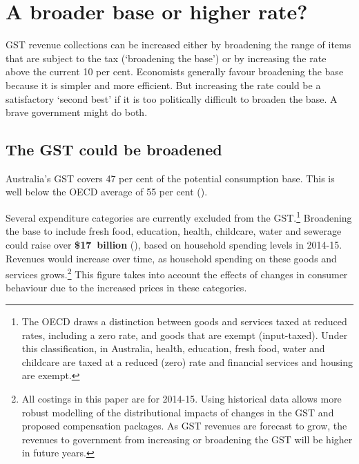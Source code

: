 \chapter{A broader base or higher rate?}\label{chapter:GST-2}
GST revenue collections can be increased either by broadening the range of items that are subject to the tax (‘broadening the base’) or by increasing the rate above the current 10 per cent. Economists generally favour broadening the base because it is simpler and more efficient. But increasing the rate could be a satisfactory ‘second best’ if it is too politically difficult to broaden the base. A brave government might do both. 

\section{The GST could be broadened}\label{sec:GST-2-1}
Australia’s GST covers 47 per cent of the potential consumption base. This is well below the OECD average of 55 per cent ().

Several expenditure categories are currently excluded from the GST.\footnote{The OECD draws a distinction between goods and services taxed at reduced rates, including a zero rate, and goods that are exempt (input-taxed). Under this classification, in Australia, health, education, fresh food, water and childcare are taxed at a reduced (zero) rate and financial services and housing are exempt.}  Broadening the base to include fresh food, education, health, childcare, water and sewerage could raise over \textbf{\$17~billion} (), based on household spending levels in 2014-15. Revenues would increase over time, as household spending on these goods and services grows.\footnote{All costings in this paper are for 2014-15. Using historical data allows more robust modelling of the distributional impacts of changes in the GST and proposed compensation packages. As GST revenues are forecast to grow, the revenues to government from increasing or broadening the GST will be higher in future years.} This figure takes into account the effects of changes in consumer behaviour due to the increased prices in these categories. 

